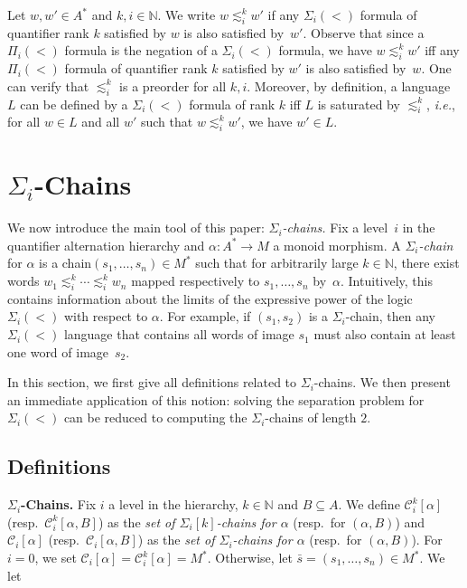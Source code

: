 \documentclass[envcountsame]{llncs}
\newcommand\nat{\ensuremath{\mathbb{N}}\xspace}
\newcommand\Cs{\ensuremath{\mathcal{C}}\xspace}
\newcommand\Csik{\ensuremath{\Cs_i^k}\xspace}
\newcommand\Csi{\ensuremath{\Cs_i}\xspace}
\newcommand{\sic}[1]{\ensuremath{\Sigma_{#1}}\xspace}
\newcommand{\siw}[1]{\ensuremath{\Sigma_{#1}(<)}\xspace}
\newcommand{\piw}[1]{\ensuremath{\Pi_{#1}(<)}\xspace}
\newcommand\sieq[2]{\ensuremath{\lesssim^{#1}_{#2}}\xspace}
\newcommand\ksieq[1]{\sieq{k}{#1}}
\newcommand\chain{chain\xspace}
\newcommand\qchain[1]{\ensuremath{\sic{#1}}-chain\xspace}
\newcommand\qchains[1]{\ensuremath{\sic{#1}}-chains\xspace}
\newcommand\qChains[1]{\ensuremath{\sic{#1}}-Chains\xspace}
\newcommand\qpchains[2]{\ensuremath{\sic{#1}[#2]}-chains\xspace}
\newcommand\ichain{\qchain{i}}
\newcommand\ichains{\qchains{i}}
\newcommand\iChains{\qChains{i}}
\newcommand\ikchains{\qpchains{i}{k}}
\begin{document}
\medskip
\noindent {\bf Preorder for \siw{i}.} Let $w,w' \in A^*$ and $k,i \in
\nat$. We write $w \ksieq{i} w'$ if any \siw{i} formula of quantifier rank $k$
satisfied by $w$ is also satisfied by~$w'$. Observe that since a \piw{i}
formula is the negation of a \siw{i} formula, we have $w
\ksieq{i} w'$ iff any \piw{i} formula of quantifier rank $k$ satisfied by $w'$
is also satisfied by~$w$. One can verify that $\ksieq{i}$ is a preorder for
all $k,i$. Moreover, by definition, a language $L$ can be defined by a \siw{i}
formula of rank $k$ iff $L$ is saturated by $\ksieq{i}$, \emph{i.e.}, for all $w \in
L$ and all $w'$ such that $w \ksieq{i} w'$, we have $w' \in L$.  


\section{\iChains}
\label{sec:chains}
We now introduce the main tool of this paper:
\emph{\ichains.} Fix a level~$i$ in the quantifier alternation
hierarchy and $\alpha : A^* \rightarrow M$ a monoid morphism. A
\emph{\ichain } for $\alpha$ is a \chain $(s_1,\dots,s_n) \in M^*$ such
that for arbitrarily large $k \in \nat$, there exist words $w_1
\ksieq{i} \cdots \ksieq{i} w_n$ mapped respectively to $s_1, \dots,
s_n$ by~$\alpha$. Intuitively, this contains information about the
limits of the expressive power of the logic $\siw{i}$ with respect to
$\alpha$. For example, if $(s_1,s_2)$ is a \ichain, then any $\siw{i}$
language that contains all words of image $s_1$ must also contain at
least one word of image~$s_2$.

\smallskip
In this section, we first give all definitions related to \ichains. We then
present an immediate application of this notion: solving the separation problem
for \siw{i} can be reduced to computing the \ichains of length $2$.

\subsection{Definitions}

\noindent
{\bf \iChains.} Fix $i$ a level in the hierarchy, $k \in \nat$ and $B
\subseteq A$. We define $\Csik[\alpha]$ (resp.\ $\Csik[\alpha,B]$) as
the \emph{set of \ikchains for $\alpha$} (resp.\ for $(\alpha,B)$) and
$\Csi[\alpha]$ (resp.\ $\Csi[\alpha,B]$) as
the \emph{set of \ichains for $\alpha$} (resp.\ for $(\alpha,B)$). For $i = 0$, we set $\Csi[\alpha] = \Csik[\alpha] = M^*$. Otherwise,
let $\bar{s} = (s_1,\dots,s_n) \in M^*$. We let
\end{document}
